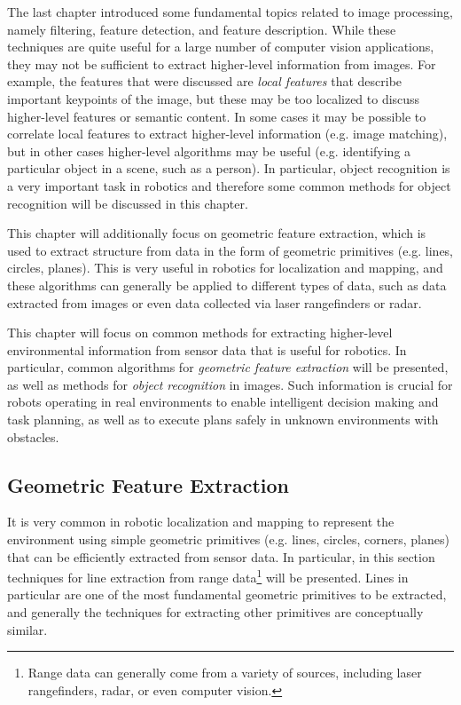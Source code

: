 The last chapter introduced some fundamental topics related to image processing, namely filtering, feature detection, and feature description. While these techniques are quite useful for a large number of computer vision applications, they may not be sufficient to extract higher-level information from images. For example, the features that were discussed are \textit{local features} that describe important keypoints of the image, but these may be too localized to discuss higher-level features or semantic content. In some cases it may be possible to correlate local features to extract higher-level information (e.g. image matching), but in other cases higher-level algorithms may be useful (e.g. identifying a particular object in a scene, such as a person). In particular, object recognition is a very important task in robotics and therefore some common methods for object recognition will be discussed in this chapter.

This chapter will additionally focus on geometric feature extraction\cite{SiegwartNourbakhshEtAl2011}, which is used to extract structure from data in the form of geometric primitives (e.g. lines, circles, planes). This is very useful in robotics for localization and mapping, and these algorithms can generally be applied to different types of data, such as data extracted from images or even data collected via laser rangefinders or radar.

This chapter will focus on common methods for extracting higher-level environmental information from sensor data that is useful for robotics. In particular, common algorithms for \textit{geometric feature extraction} will be presented, as well as methods for \textit{object recognition} in images. Such information is crucial for robots operating in real environments to enable intelligent decision making and task planning, as well as to execute plans safely in unknown environments with obstacles.

\subsection{Geometric Feature Extraction}
It is very common in robotic localization and mapping to represent the environment using simple geometric primitives (e.g. lines, circles, corners, planes) that can be efficiently extracted from sensor data. In particular, in this section techniques for line extraction from range data\footnote{Range data can generally come from a variety of sources, including laser rangefinders, radar, or even computer vision.} will be presented. Lines in particular are one of the most fundamental geometric primitives to be extracted, and generally the techniques for extracting other primitives are conceptually similar.

